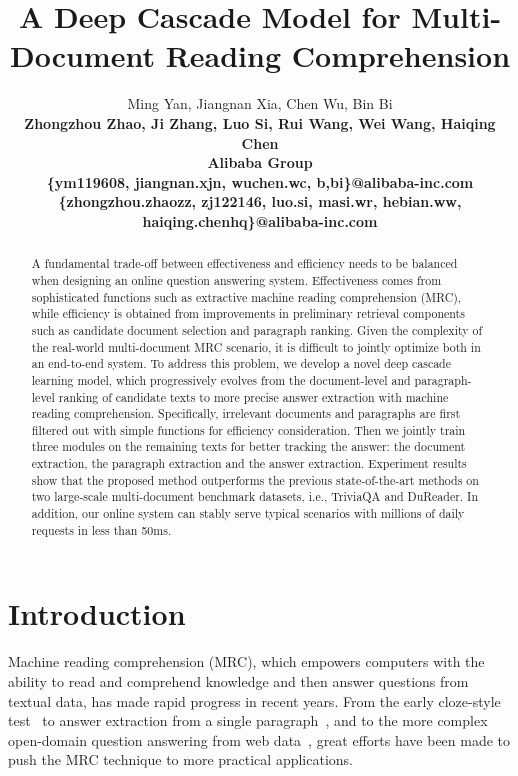 \documentclass[letterpaper]{article} \usepackage{aaai19}  \usepackage{graphicx}
\begin{document}
\title{A Deep Cascade Model for Multi-Document Reading Comprehension}

\author{Ming Yan, Jiangnan Xia, Chen Wu, Bin Bi\\  \bf \Large  Zhongzhou Zhao, Ji Zhang, Luo Si, Rui Wang, Wei Wang, Haiqing Chen 
\\ Alibaba Group
\\ \{ym119608, jiangnan.xjn, wuchen.wc, b,bi\}@alibaba-inc.com
 \\ \{zhongzhou.zhaozz, zj122146, luo.si, masi.wr, hebian.ww, haiqing.chenhq\}@alibaba-inc.com} 

\maketitle
\begin{abstract}
A fundamental trade-off between effectiveness and efficiency needs to be balanced when designing an online question answering system. Effectiveness comes from sophisticated functions such as extractive machine reading comprehension (MRC), while efficiency is obtained from improvements in preliminary retrieval components such as candidate document selection and paragraph ranking. Given the complexity of the real-world multi-document MRC scenario, it is difficult to jointly optimize both in an end-to-end system. To address this problem, we develop a novel deep cascade learning model, which progressively evolves from the document-level and paragraph-level ranking of candidate texts to more precise answer extraction with machine reading comprehension. Specifically, irrelevant documents and paragraphs are first filtered out with simple functions for efficiency consideration. Then we jointly train three modules on the remaining texts for better tracking the answer: the document extraction,  the paragraph extraction and the answer extraction. Experiment results show that the proposed method outperforms the previous state-of-the-art methods on two large-scale multi-document benchmark datasets, i.e., TriviaQA and DuReader. In addition, our online system can stably serve typical scenarios with millions of daily requests in less than 50ms.
\end{abstract}

\section{Introduction}

Machine reading comprehension (MRC), which empowers computers with the ability to read and comprehend knowledge and then answer questions from textual data, has made rapid progress in recent years. From the early cloze-style test~\cite{hermann2015teaching,hill2015goldilocks} to answer extraction from a single paragraph~\cite{rajpurkar2016squad}, and to the more complex open-domain question answering from web data~\cite{joshi2017triviaqa,nguyen2016ms}, great efforts have been made to push the MRC technique to more practical applications.
\end{document}

